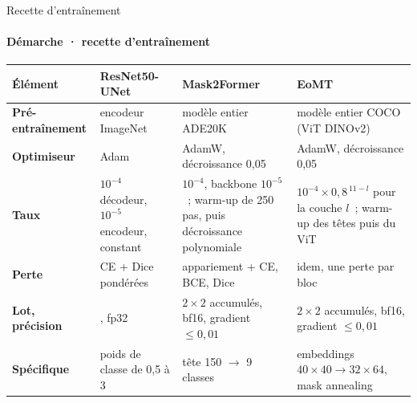 \documentclass[aspectratio=169,9pt,xcolor=table,t]{beamer}
\newcommand{\cvsource}{}
\newcommand{\setsource}[1]{\gdef\cvsource{\ \textperiodcentered\ #1}}
\begin{document}
{
\begin{frame}{Recette d'entraînement}
\framesubtitle{Démarche · recette d'entraînement}
\setsource{détails et équations~: doc/poc\_mathematical\_models.tex}
\vspace{1mm}
\begin{card}[colframe=white,left=2mm,right=2mm]
\small
\renewcommand{\arraystretch}{1.35}
\begin{tabularx}{\linewidth}{@{}>{\bfseries}p{23mm}>{\raggedright\arraybackslash}p{30mm}>{\raggedright\arraybackslash}X>{\raggedright\arraybackslash}X@{}}
\toprule
Élément & ResNet50-UNet & Mask2Former & EoMT\\
\midrule
Pré-entraînement & encodeur ImageNet & modèle entier ADE20K & modèle entier COCO (ViT DINOv2)\\
Optimiseur & Adam & AdamW, décroissance 0,05 & AdamW, décroissance 0,05\\
Taux & $10^{-4}$ décodeur, $10^{-5}$ encodeur, constant & $10^{-4}$, backbone $10^{-5}$~; warm-up de 250 pas, puis décroissance polynomiale & $10^{-4}\times 0{,}8^{\,11-l}$ pour la couche $l$~; warm-up des têtes puis du ViT\\
Perte & CE + Dice pondérées & appariement + CE, BCE, Dice & idem, une perte par bloc\\
Lot, précision & 4, fp32 & $2\times2$ accumulés, bf16, gradient $\le 0{,}01$ & $2\times2$ accumulés, bf16, gradient $\le 0{,}01$\\
Spécifique & poids de classe de 0,5 à 3 & tête 150 $\rightarrow$ 9 classes & embeddings $40\times40 \rightarrow 32\times64$, mask annealing\\
\bottomrule
\end{tabularx}
\end{card}
\end{frame}
}
\end{document}
